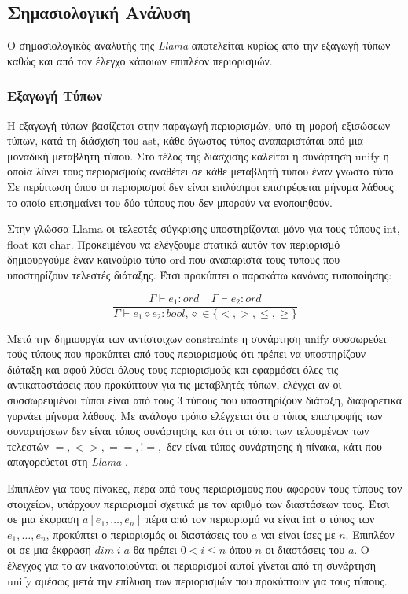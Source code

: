 \documentclass[12pt]{article}
\newcommand{\Llama}{\textit{Llama }}
\begin{document}
\subsection{Σημασιολογική Ανάλυση}
Ο σημασιολογικός αναλυτής της \Llama αποτελείται κυρίως από την εξαγωγή τύπων καθώς και από τον έλεγχο κάποιων επιπλέον περιορισμών.
\subsubsection{Εξαγωγή Τύπων}
Η εξαγωγή τύπων βασίζεται στην παραγωγή περιορισμών, υπό τη μορφή εξισώσεων τύπων, κατά τη διάσχιση του ast, κάθε άγωστος τύπος αναπαριστάται από μια μοναδική μεταβλητή τύπου. Στο τέλος της διάσχισης καλείται η συνάρτηση unify η οποία λύνει τους περιορισμούς αναθέτει σε κάθε μεταβλητή τύπου έναν γνωστό τύπο. Σε περίπτωση όπου οι περιορισμοί δεν είναι επιλύσιμοι επιστρέφεται μήνυμα λάθους το οποίο επισημαίνει του δύο τύπους που δεν μπορούν να ενοποιηθούν.


Στην γλώσσα Llama οι τελεστές σύγκρισης υποστηρίζονται μόνο για τους τύπους int, float και char. Προκειμένου να ελέγξουμε στατικά αυτόν τον περιορισμό δημιουργούμε έναν καινούριο τύπο ord που αναπαριστά τους τύπους που υποστηρίζουν τελεστές διάταξης. Έτσι προκύπτει ο παρακάτω κανόνας τυποποίησης:

$$\frac{\Gamma  \vdash e_1 : ord \;\;\;\; \Gamma  \vdash e_2 : ord  }{\Gamma  \vdash e_1 \diamond e_2 : bool,\diamond \in \lbrace <,>, \leq, \geq\rbrace}$$


Μετά την δημιουργία των αντίστοιχων constraints η συνάρτηση unify συσσωρεύει τούς τύπους που προκύπτει από τους περιορισμούς ότι πρέπει να υποστηρίζουν διάταξη και αφού λύσει όλους τους περιορισμούς και εφαρμόσει όλες τις αντικαταστάσεις που προκύπτουν για τις μεταβλητές τύπων, ελέγχει αν οι συσσωρευμένοι τύποι είναι από τους 3 τύπους που υποστηρίζουν διάταξη, διαφορετικά γυρνάει μήνυμα λάθους. Με ανάλογο τρόπο ελέγχεται ότι ο τύπος επιστροφής των συναρτήσεων δεν είναι τύπος συνάρτησης και ότι οι τύποι των τελουμένων των τελεστών $=,<>,==,!=,$ δεν είναι τύπος συνάρτησης ή πίνακα, κάτι που απαγορεύεται στη \Llama. 

Επιπλέον για τους πίνακες, πέρα από τους περιορισμούς που αφορούν τους τύπους τον στοιχείων, υπάρχουν περιορισμοί σχετικά με τον αριθμό των διαστάσεων τους. Έτσι σε μια έκφραση $a[e_1, \ldots, e_n]$ πέρα από τον περιορισμό να είναι int ο τύπος των $e_1, \ldots, e_n$, προκύπτει ο περιορισμός οι διαστάσεις του $a$ ναι είναι ίσες με $n$. Επιπλέον οι σε μια έκφραση $dim \; i \; a$ θα πρέπει $0 < i \leq n$ όπου $n$ οι διαστάσεις του $a$. Ο έλεγχος για το αν ικανοποιούνται οι περιορισμοί αυτοί γίνεται από τη συνάρτηση unify αμέσως μετά την επίλυση των περιορισμών που προκύπτουν για τους τύπους.
\end{document}
